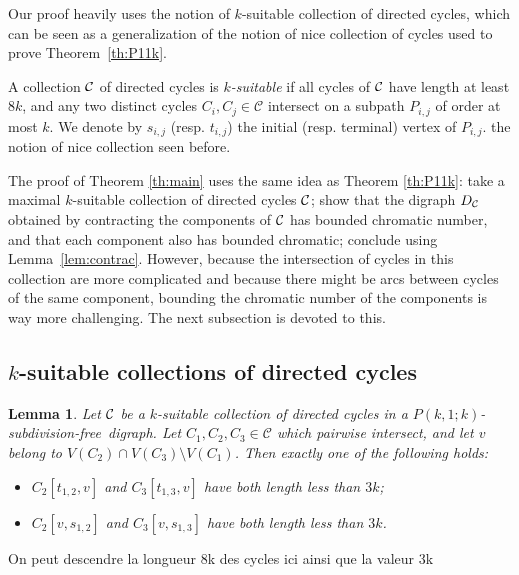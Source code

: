 \documentclass[utf8,10pt]{article}
\theoremstyle{plain}
\newtheorem{lemma}[theorem]{Lemma}
\theoremstyle{definition}
\theoremstyle{remark}
\newcommand{\FH}[1]{{\color{red}{\bf Fred:} #1}}
\newcommand{\free}{subdivision-free}
\begin{document}
Our proof heavily uses the notion of $k$-suitable collection of directed cycles, which can be seen as a generalization of the notion of nice collection of cycles used to prove Theorem~\ref{th:P11k}.

 
 A collection ${\cal C}$ of directed cycles is {\it $k$-suitable} if all cycles of ${\cal C}$ have length at least $8k$, and
any two distinct cycles $C_i,C_j\in\mathcal C$ intersect on  a subpath $P_{i,j}$ of order at most $k$.
We denote by $s_{i,j}$ (resp. $t_{i,j}$) the initial (resp. terminal) vertex of  $P_{i,j}$. %
the notion of nice collection seen before. 

The proof of Theorem \ref{th:main} uses the same idea as Theorem \ref{th:P11k}: take a maximal $k$-suitable collection of directed cycles ${\cal C}$; show that the digraph $D_{\cal C}$ obtained by contracting the components of ${\cal C}$ has bounded chromatic number, and that each component also has bounded chromatic; conclude using Lemma~\ref{lem:contrac}. However, because the intersection of cycles in this collection are more
complicated and because there might be arcs between cycles of the same component, bounding the chromatic number of the components is way more challenging. The next subsection is devoted to this.
 
 
 \subsection{$k$-suitable collections of directed cycles}

 
 
 \begin{lemma}\label{lem:dis}
 Let ${\cal C}$ be a $k$-suitable collection of directed cycles in a $P(k,1;k)$-\free\ digraph.
Let $C_1,C_2,C_3\in\mathcal C$ which pairwise intersect, and let $v$ belong to $V(C_2)\cap V(C_3)\setminus V(C_1)$. 
Then exactly one of the following holds:
\begin{itemize}
\item[(i)] $C_2[t_{1,2}, v]$ and $C_3[t_{1,3}, v]$ have both length less than $3k$; 
\item[(ii)] $C_2[v, s_{1,2}]$ and $C_3[v, s_{1,3}]$ have both length less than $3k$.
\end{itemize}
\end{lemma}

\FH{On peut descendre la longueur 8k des cycles ici ainsi que la valeur 3k}
 
\end{document}
